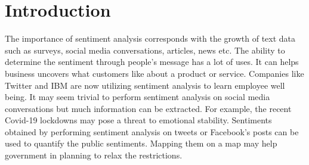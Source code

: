 \section{Introduction}
The importance of sentiment analysis corresponds with the growth of text data such as surveys, social media conversations, articles, news etc. The ability to determine the sentiment through people's message has a lot of uses. It can helps business uncovers what customers like about a product or service. Companies like Twitter and IBM are now utilizing sentiment analysis to learn employee well being. It may seem trivial to perform sentiment analysis on social media conversations but much information can be extracted. For example, the recent Covid-19 lockdowns may pose a threat to emotional stability. Sentiments obtained by performing sentiment analysis on tweets or Facebook's posts can be used to quantify the public sentiments. Mapping them on a map may help government in planning to relax the restrictions. 